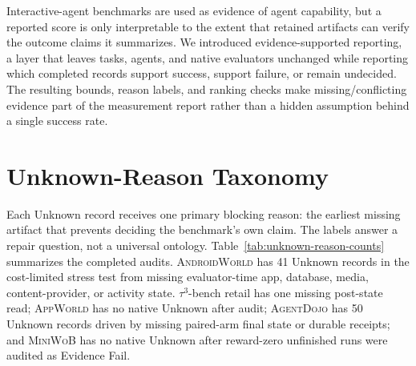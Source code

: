 \documentclass{article}
\newcommand{\agentdojo}{\textsc{AgentDojo}\xspace}
\newcommand{\appworld}{\textsc{AppWorld}\xspace}
\newcommand{\tauthree}{\(\tau^3\)-bench retail\xspace}
\newcommand{\androidworld}{\textsc{AndroidWorld}\xspace}
\newcommand{\miniwob}{\textsc{MiniWoB}\xspace}
\begin{document}
Interactive-agent benchmarks are used as evidence of agent capability, but a
reported score is only interpretable to the extent that retained artifacts can
verify the outcome claims it summarizes. We introduced evidence-supported
reporting, a layer that leaves tasks, agents, and native
evaluators unchanged while reporting which completed records support success,
support failure, or remain undecided. The resulting bounds, reason labels, and
ranking checks make missing/conflicting evidence part of the measurement
report rather than a hidden assumption behind a single success rate.

\clearpage



\appendix

\section{Unknown-Reason Taxonomy}
\label{app:unresolve-taxonomy}
\label{sec:taxonomy}

Each Unknown record receives one primary blocking reason: the earliest missing
artifact that prevents deciding the benchmark's own claim. The labels answer a
repair question, not a universal ontology. Table~\ref{tab:unknown-reason-counts}
summarizes the completed audits. \androidworld has 41 Unknown records in the
cost-limited stress test from missing evaluator-time app, database, media,
content-provider, or activity state. \tauthree has one missing post-state read;
\appworld has no native Unknown after audit; \agentdojo has 50 Unknown records
driven by missing paired-arm final state or durable receipts; and \miniwob has no
native Unknown after reward-zero unfinished runs were audited as Evidence Fail.
\end{document}
